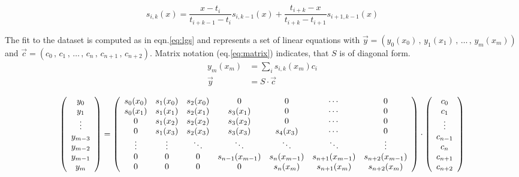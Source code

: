 \documentclass[a4paper]{article}
\begin{document}
\begin{equation}
s_{i,k}(x) = \frac{x - t_i}{t_{i+k-1} - t_i} s_{i,k-1}(x)+ \frac{t_{i+k} - x}{t_{i+k} - t_{i+1}} s_{i+1,k-1}(x)
\label{eq:bik}
\end{equation}

The fit to the dataset is computed  as in eqn.\ref{eq:lgs} and represents a set of linear equations with $\vec{y}=\left(y_0(x_0)\, , \,y_1(x_1)\, , \, \hdots \, , \, y_m(x_m)\right)$ and $\vec{c}=\left(c_0\, , \,c_1\, , \, \hdots \,  ,\, c_{n} \, , \, c_{n+1}\, , \,c_{n+2}\right)$. Matrix notation (eq.\ref{eq:matrix}) indicates, that $S$ is of diagonal form. 
\begin{align}
y_m(x_m) &= \sum_i s_{i,k}(x_m) c_i\nonumber\\
\vec{y} &= S \cdot \vec{c}\label{eq:lgs}
\end{align}

\scriptsize
\begin{equation}
\left(\begin{array}{c}
y_0\\
y_1\\
\vdots\\
y_{m-3}\\
y_{m-2}\\
y_{m-1}\\
y_{m}
\end{array}\right)= \left(\begin{array}{ccccccc}
	s_{0}(x_{0}) &s_{1}(x_{0})  &s_{2}(x_{0}) 	&0 						&0 						&\cdots 	 	&0\\
	s_{0}(x_{1}) &s_{1}(x_{1})  &s_{2}(x_{1}) 	&s_{3}(x_{1}) 	&0 						&\cdots 	 	&0\\
	0  					&s_{1}(x_{2})  &s_{2}(x_{2}) 	&s_{3}(x_{2}) 	&0 						&\cdots	 	&0\\
	0  					&s_{1}(x_{3})  &s_{2}(x_{3}) 	&s_{3}(x_{3}) 	&s_{4}(x_{3}) 	&\cdots	 	&0\\
	\vdots			&\vdots						&\ddots				&\ddots				&\ddots				&\ddots		&\vdots\\	
	0						&0						&0							&s_{n-1}(x_{m-1})							&s_{n}(x_{m-1})		&s_{n+1}(x_{m-1})					&s_{n+2}(x_{m-1})\\
	0						&0						&0							&0							&s_{n}(x_{m})		&s_{n+1}(x_{m})					&s_{n+2}(x_{m})
\end{array}\right)\cdot \left(\begin{array}{c}
c_0\\
c_1\\
\vdots\\
c_{n-1}\\
c_n\\
c_{n+1}\\
c_{n+2}
\end{array}\right)
\normalsize\label{eq:matrix}					%
\end{equation}
\end{document}
